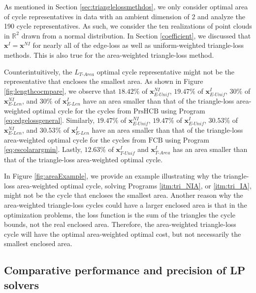 \documentclass[utf8]{formatting_stuff/frontiersFPHY}
\newcommand{\optimalrep}{\mathbf{x}}
\newcommand{\se}{Section }
\newcommand{\fig}{Figure }
\newcommand{\NI}{^{NI}}
\newcommand{\I}{^I}
\newcommand{\setoffilteredcyclebases}{\mathrm{FCB}}
\newcommand{\setofpersistenthcyclebases}{\mathrm{PrsHCB}}
\newcommand{\EU}{_{E\text{-}Unif}}
\newcommand{\EL}{_{E\text{-}Len}}
\newcommand{\TU}{_{T\text{-}Unif}}
\newcommand{\TA}{_{T\text{-}Area}}
\theoremstyle{plain}
\theoremstyle{definition}
\begin{document}
As mentioned in \se \ref{sec:trianglelossmethdos}, we only consider optimal area of cycle representatives in data with an ambient dimension of $2$ and analyze the 190 cycle representatives. As such, we consider the ten realizations of point clouds in $\mathbb{R}^2$ drawn from a normal distribution. In \se \ref{coefficient}, we discussed that $\optimalrep\I = \optimalrep\NI$ for nearly all of the edge-loss as well as uniform-weighted triangle-loss methods. This is also true for the area-weighted triangle-loss method.


Counterintuitively, the $L\TA$ optimal cycle representative might not be the representative that encloses the smallest area. As shown in \fig\ref{fig:lengthcocmpare}, we observe that $18.42\%$ of $\optimalrep\EU\NI$, $19.47\%$ of $\optimalrep\EU\I$, $30\%$ of $\optimalrep\EL\NI$, and $30\%$ of  $\optimalrep\EL\I$ have an area smaller than that of the triangle-loss area-weighted optimal cycle for the cycles from $\setofpersistenthcyclebases$ using Program \eqref{eq:edgelossgeneral}. 
Similarly,  $19.47\%$ of $\optimalrep\EU\NI$, $19.47\%$ of  $\optimalrep\EU\I$, $30.53\%$ of $\optimalrep\EL\NI$, and $30.53\%$ of $\optimalrep\EL\I$ have an area smaller than that of the triangle-loss area-weighted optimal cycle for the cycles from $\setoffilteredcyclebases$ using Program \eqref{eq:escolarargmin}. Lastly, $12.63\%$ of $\optimalrep^{I}\TU$ and $\optimalrep^{I}\TA$ has an area smaller than that of the triangle-loss area-weighted optimal cycle.  

In Figure \ref{fig:areaExample}, we provide an example illustrating why the triangle-loss area-weighted optimal cycle, solving Programs \ref{itm:tri_NIA}, or
\ref{itm:tri_IA}, might not be the cycle that encloses the smallest area. Another reason why the area-weighted triangle-loss cycles could have a larger enclosed area is that in the optimization problems, the loss function is the sum of the triangles the cycle bounds, not the real enclosed area. Therefore, the area-weighted triangle-loss cycle will have the optimal area-weighted optimal cost, but not necessarily the smallest enclosed area. 

 
\subsection{Comparative performance and precision of LP solvers}\label{Computational cost of the various optimization techniques}
\end{document}
